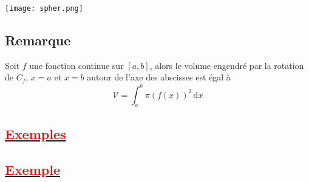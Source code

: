 \documentclass[12pt]{article}
\begin{document}
\begin{center}
    \texttt{[image: spher.png]}
\end{center}

\subsection*{Remarque}

Soit $f$ une fonction continue sur $[a, b]$, alors le volume engendré par la rotation de $C_{f}$, $x=a$ et $x=b$ autour de l'axe des abscisses est égal à 
$$\mathcal{V}=\int_{a}^{b} \pi (f(x))^{2} \, \mathrm{d}x$$ 
\subsection*{\underline{\textbf{\textcolor{red}{Exemples}}}}
\subsection*{\underline{\textbf{\textcolor{red}{Exemple }}}}
\end{document}
